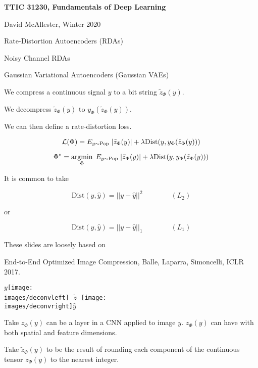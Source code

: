 





{\Huge

  \centerline{\bf TTIC 31230, Fundamentals of Deep Learning}
  \bigskip
  \centerline{David McAllester, Winter 2020}
  \vfill
  \centerline{Rate-Distortion Autoencoders (RDAs)}
  \vfill
  \centerline{Noisy Channel RDAs}
  \vfill
  \centerline{Gaussian Variational Autoencoders (Gaussian VAEs)}


We compress a continuous signal $y$ to a bit string $\tilde{z}_\Phi(y)$.

\vfill
We decompress $\tilde{z}_\Phi(y)$ to $y_\Phi(\tilde{z}_\Phi(y))$.

\vfill
We can then define a rate-distortion loss.

{\color{red} $${\cal L}(\Phi) = E_{y \sim \mathrm{Pop}}\;|\tilde{z}_\Phi(y)| + \lambda \mathrm{Dist}(y,y_\Phi(\tilde{z}_\Phi(y)))$$}



$$\Phi^* = \operatorname*{argmin}_\Phi\;E_{y \sim \mathrm{Pop}}\;|\tilde{z}_\Phi(y)| + \lambda \mathrm{Dist}(y,y_\Phi(\tilde{z}_\Phi(y)))$$

\vfill
It is common to take

$$\mathrm{Dist}(y,\hat{y}) = ||y-\hat{y}||^2 \hspace{4em}(L_2)$$

\vfill
or

$$\mathrm{Dist}(y,\hat{y}) = ||y-\hat{y}||_1 \hspace{4em} (L_1)$$


These slides are loosely based on

\vfill
End-to-End Optimized Image Compression, Balle, Laparra, Simoncelli, ICLR 2017.


\vfill
\centerline{$y$\texttt{[image: \\images/deconvleft]} $\;\tilde{z}\;$ \texttt{[image: \\images/deconvright]}$\hat{y}$}



Take $z_\Phi(y)$ can be a layer in a CNN applied to image $y$.  $z_\Phi(y)$ can have with both spatial and feature dimensions.

\vfill
Take $\tilde{z}_\Phi(y)$ to be the result of rounding each component of the continuous tensor $z_\Phi(y)$ to the nearest integer.

}
